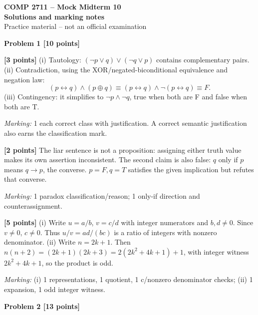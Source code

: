 \documentclass[12pt,letterpaper]{article}
\newcommand{\problemheading}[2][5\baselineskip]{\Needspace{#1}\par\noindent\hspace*{-0.625in}\textbf{#2}\par\nobreak\vspace{0.3em}}
\begin{document}
\begin{center}\textbf{COMP 2711 -- Mock Midterm 10}\\{\large\bfseries Solutions and marking notes}\\Practice material -- not an official examination\end{center}\vspace{0.5em}
\problemheading[\dimexpr 3\baselineskip+4\baselineskip\relax]{Problem 1 [10 points]}
\begin{description}[font=\normalfont,leftmargin=1.2em,labelsep=0.4em]
\item[(a)] \textbf{[3 points]} (i) Tautology: $(\neg p\lor q)\lor(\neg q\lor p)$ contains complementary pairs. (ii) Contradiction, using the XOR/negated-biconditional equivalence and negation law:\[(p\leftrightarrow q)\land(p\oplus q)\equiv(p\leftrightarrow q)\land\neg(p\leftrightarrow q)\equiv F.\] (iii) Contingency: it simplifies to $\neg p\land\neg q$, true when both are F and false when both are T.
\par\textit{Marking:} 1 each correct class with justification. A correct semantic justification also earns the classification mark.
\item[(b)] \textbf{[2 points]} The liar sentence is not a proposition: assigning either truth value makes its own assertion inconsistent. The second claim is also false: $q$ only if $p$ means $q\to p$, the converse. $p=F,q=T$ satisfies the given implication but refutes that converse.
\par\textit{Marking:} 1 paradox classification/reason; 1 only-if direction and counterassignment.
\item[(c)] \textbf{[5 points]} (i) Write $u=a/b$, $v=c/d$ with integer numerators and $b,d\ne0$. Since $v\ne0$, $c\ne0$. Thus $u/v=ad/(bc)$ is a ratio of integers with nonzero denominator. (ii) Write $n=2k+1$. Then $n(n+2)=(2k+1)(2k+3)=2(2k^2+4k+1)+1$, with integer witness $2k^2+4k+1$, so the product is odd.
\par\textit{Marking:} (i) 1 representations, 1 quotient, 1 c/nonzero denominator checks; (ii) 1 expansion, 1 odd integer witness.
\end{description}
\vspace{0.65em}
\problemheading[\dimexpr 3\baselineskip+4\baselineskip\relax]{Problem 2 [13 points]}
\end{document}

